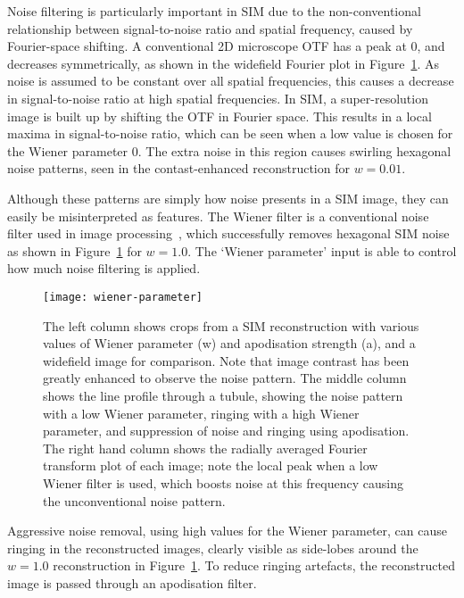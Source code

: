 Noise filtering is particularly important in SIM due to the non-conventional relationship between signal-to-noise ratio and spatial frequency, caused by Fourier-space shifting. 
A conventional 2D microscope OTF has a peak at 0, and decreases symmetrically, as shown in the widefield Fourier plot in Figure~\ref{fig:wiener-parameter}. 
As noise is assumed to be constant over all spatial frequencies, this causes a decrease in signal-to-noise ratio at high spatial frequencies. 
In SIM, a super-resolution image is built up by shifting the OTF in Fourier space. 
This results in a local maxima in signal-to-noise ratio, which can be seen when a low value is chosen for the Wiener parameter 0. 
The extra noise in this region causes swirling hexagonal noise patterns, seen in the contast-enhanced reconstruction for $w=0.01$. 

Although these patterns are simply how noise presents in a SIM image, they can easily be misinterpreted as features. 
The Wiener filter is a conventional noise filter used in image processing~\cite[\textit{ch. 4}]{brown2012introduction}, which successfully removes hexagonal SIM noise as shown in Figure~\ref{fig:wiener-parameter} for $w=1.0$. 
The `Wiener parameter' input is able to control how much noise filtering is applied. 


\begin{figure}[p]
\centering
\texttt{[image: wiener-parameter]}
\caption[LAG SIM: The Wiener parameter and apodisation strength must be chosen to minimise artefacts]{The left column shows crops from a SIM reconstruction with various values of Wiener parameter (w) and apodisation strength (a), and a widefield image for comparison. Note that image contrast has been greatly enhanced to observe the noise pattern. The middle column shows the line profile through a tubule, showing the noise pattern with a low Wiener parameter, ringing with a high Wiener parameter, and suppression of noise and ringing using apodisation. The right hand column shows the radially averaged Fourier transform plot of each image; note the local peak when a low Wiener filter is used, which boosts noise at this frequency causing the unconventional noise pattern.}
\label{fig:wiener-parameter}
\end{figure}

Aggressive noise removal, using high values for the Wiener parameter, can cause ringing in the reconstructed images, clearly visible as side-lobes around the $w=1.0$ reconstruction in Figure~\ref{fig:wiener-parameter}. 
To reduce ringing artefacts, the reconstructed image is passed through an apodisation filter. 

